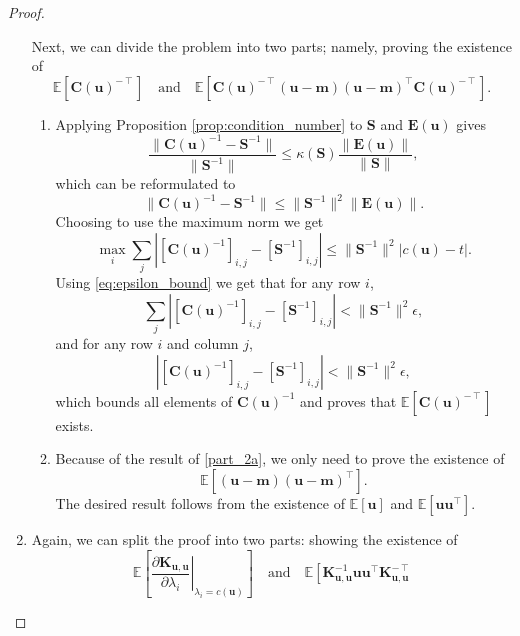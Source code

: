 \documentclass{article}
\theoremstyle{definition}
\newcommand{\Kuu}{\mathbf{K}_{\mathbf{u},\mathbf{u}}}
\begin{document}
\begin{proof}
\begin{enumerate}
    Next, we can divide the problem into two parts; namely, proving the
    existence of
    \[
      \mathbb{E}[\mathbf{C}(\mathbf{u})^{-\intercal}] \quad \text{and} \quad
      \mathbb{E}[\mathbf{C}(\mathbf{u})^{-\intercal}(\mathbf{u} -
      \mathbf{m})(\mathbf{u} -
      \mathbf{m})^\intercal\mathbf{C}(\mathbf{u})^{-\intercal}].
    \]
    \begin{enumerate}
    \item \label{part_2a} Applying Proposition \ref{prop:condition_number} to
      $\mathbf{S}$ and $\mathbf{E}(\mathbf{u})$ gives
      \[
        \frac{\lVert \mathbf{C}(\mathbf{u})^{-1} - \mathbf{S}^{-1}
          \rVert}{\lVert \mathbf{S}^{-1} \rVert} \le
        \kappa(\mathbf{S})\frac{\lVert \mathbf{E}(\mathbf{u}) \rVert}{\lVert
          \mathbf{S} \rVert},
      \] %
      which can be reformulated to
      \[
        \lVert \mathbf{C}(\mathbf{u})^{-1} - \mathbf{S}^{-1} \rVert \le \lVert
        \mathbf{S}^{-1} \rVert^2 \lVert \mathbf{E}(\mathbf{u}) \rVert.
      \]
      Choosing to use the maximum norm we get
      \[
        \max_i \sum_j |[\mathbf{C}(\mathbf{u})^{-1}]_{i,j} -
        [\mathbf{S}^{-1}]_{i,j}| \le \lVert \mathbf{S}^{-1} \rVert^2
        |c(\mathbf{u}) - t|.
      \]
      Using \eqref{eq:epsilon_bound} we get that for any row $i$,
      \[
        \sum_j \left| [\mathbf{C}(\mathbf{u})^{-1}]_{i,j} -
          [\mathbf{S}^{-1}]_{i,j} \right| <
        \lVert \mathbf{S}^{-1} \rVert^2\epsilon,
      \]
      and for any row $i$ and column $j$,
      \[
        \left| [\mathbf{C}(\mathbf{u})^{-1}]_{i,j} - [\mathbf{S}^{-1}]_{i,j}
        \right| < \lVert \mathbf{S}^{-1} \rVert^2\epsilon,
      \]
      which bounds all elements of $\mathbf{C}(\mathbf{u})^{-1}$ and proves that
      $\mathbb{E}[\mathbf{C}(\mathbf{u})^{-\intercal}]$ exists.
    \item Because of the result of \ref{part_2a}, we only need to prove the
      existence of
      \[
        \mathbb{E}[(\mathbf{u} - \mathbf{m})(\mathbf{u} -
        \mathbf{m})^\intercal].
      \]
      The desired result follows from the existence of $\mathbb{E}[\mathbf{u}]$
      and $\mathbb{E}[\mathbf{u}\mathbf{u}^\intercal]$.
    \end{enumerate}
  \item Again, we can split the proof into two parts: showing the existence of
    \[
      \mathbb{E} \left[ \left. \frac{\partial \Kuu}{\partial \lambda_i}
        \right|_{\lambda_i = c(\mathbf{u})} \right] \quad \text{and} \quad
      \mathbb{E} \left[ \Kuu^{-1}\mathbf{u}\mathbf{u}^\intercal\Kuu^{-\intercal}
\]
\end{enumerate}
\end{proof}
\end{document}
